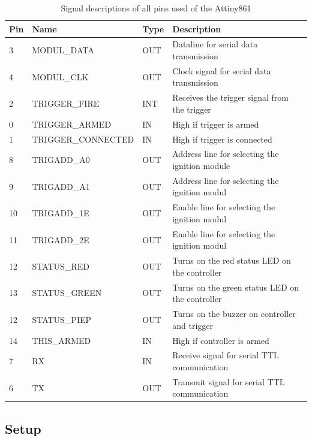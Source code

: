 \begin{table}[!ht]
    \centering
	\begin{tabular}{|l|l|l|l|}\hline
Pin & Name               & Type &Description \\ \hline \hline
3   & MODUL\_DATA        & OUT & Dataline for serial data transmission\\ \hline
4   & MODUL\_CLK         & OUT & Clock signal for serial data transmission\\ \hline
2   & TRIGGER\_FIRE      & INT & Receives the trigger signal from the trigger\\ \hline
0   & TRIGGER\_ARMED     & IN & High if trigger is armed\\ \hline
1   & TRIGGER\_CONNECTED & IN & High if trigger is connected           \\ \hline
8   & TRIGADD\_A0        & OUT & Address line for selecting the ignition module\\ \hline
9   & TRIGADD\_A1        & OUT & Address line for selecting the ignition modul\\ \hline
10  & TRIGADD\_1E        & OUT & Enable line for selecting the ignition modul\\ \hline
11  & TRIGADD\_2E        & OUT & Enable line for selecting the ignition modul\\ \hline
12  & STATUS\_RED        & OUT & Turns on the red status LED on the controller\\ \hline
13  & STATUS\_GREEN      & OUT & Turns on the green status LED on the controller\\ \hline
12  & STATUS\_PIEP       & OUT & Turns on the buzzer on controller and trigger\\ \hline
14  & THIS\_ARMED        & IN & High if controller is armed\\ \hline
7   & RX                 & IN & Receive signal for serial TTL communication\\ \hline
6   & TX                 & OUT & Transmit signal for serial TTL communication\\ \hline
	\end{tabular}
	\caption{Signal descriptions of all pins used of the Attiny861}
	\label{tab:pinio}
\end{table}

\pagebreak

\subsection{Setup}
\label{FSetup}

